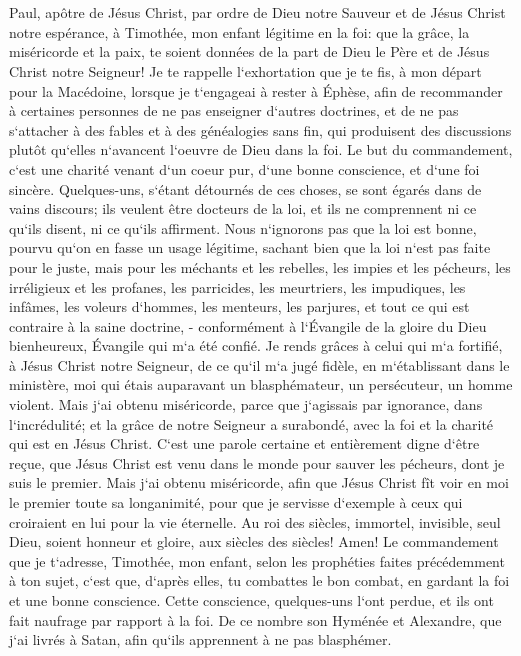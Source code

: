 

\chapter{}

\verse Paul, apôtre de Jésus Christ, par ordre de Dieu notre Sauveur et de Jésus Christ notre espérance, 
\verse à Timothée, mon enfant légitime en la foi: que la grâce, la miséricorde et la paix, te soient données de la part de Dieu le Père et de Jésus Christ notre Seigneur! 
\verse Je te rappelle l`exhortation que je te fis, à mon départ pour la Macédoine, lorsque je t`engageai à rester à Éphèse, afin de recommander à certaines personnes de ne pas enseigner d`autres doctrines, 
\verse et de ne pas s`attacher à des fables et à des généalogies sans fin, qui produisent des discussions plutôt qu`elles n`avancent l`oeuvre de Dieu dans la foi. 
\verse Le but du commandement, c`est une charité venant d`un coeur pur, d`une bonne conscience, et d`une foi sincère. 
\verse Quelques-uns, s`étant détournés de ces choses, se sont égarés dans de vains discours; 
\verse ils veulent être docteurs de la loi, et ils ne comprennent ni ce qu`ils disent, ni ce qu`ils affirment. 
\verse Nous n`ignorons pas que la loi est bonne, pourvu qu`on en fasse un usage légitime, 
\verse sachant bien que la loi n`est pas faite pour le juste, mais pour les méchants et les rebelles, les impies et les pécheurs, les irréligieux et les profanes, les parricides, les meurtriers, 
\verse les impudiques, les infâmes, les voleurs d`hommes, les menteurs, les parjures, et tout ce qui est contraire à la saine doctrine, - 
\verse conformément à l`Évangile de la gloire du Dieu bienheureux, Évangile qui m`a été confié. 
\verse Je rends grâces à celui qui m`a fortifié, à Jésus Christ notre Seigneur, de ce qu`il m`a jugé fidèle, 
\verse en m`établissant dans le ministère, moi qui étais auparavant un blasphémateur, un persécuteur, un homme violent. Mais j`ai obtenu miséricorde, parce que j`agissais par ignorance, dans l`incrédulité; 
\verse et la grâce de notre Seigneur a surabondé, avec la foi et la charité qui est en Jésus Christ. 
\verse C`est une parole certaine et entièrement digne d`être reçue, que Jésus Christ est venu dans le monde pour sauver les pécheurs, dont je suis le premier. 
\verse Mais j`ai obtenu miséricorde, afin que Jésus Christ fît voir en moi le premier toute sa longanimité, pour que je servisse d`exemple à ceux qui croiraient en lui pour la vie éternelle. 
\verse Au roi des siècles, immortel, invisible, seul Dieu, soient honneur et gloire, aux siècles des siècles! Amen! 
\verse Le commandement que je t`adresse, Timothée, mon enfant, selon les prophéties faites précédemment à ton sujet, c`est que, d`après elles, tu combattes le bon combat, 
\verse en gardant la foi et une bonne conscience. Cette conscience, quelques-uns l`ont perdue, et ils ont fait naufrage par rapport à la foi. 
\verse De ce nombre son Hyménée et Alexandre, que j`ai livrés à Satan, afin qu`ils apprennent à ne pas blasphémer. 

